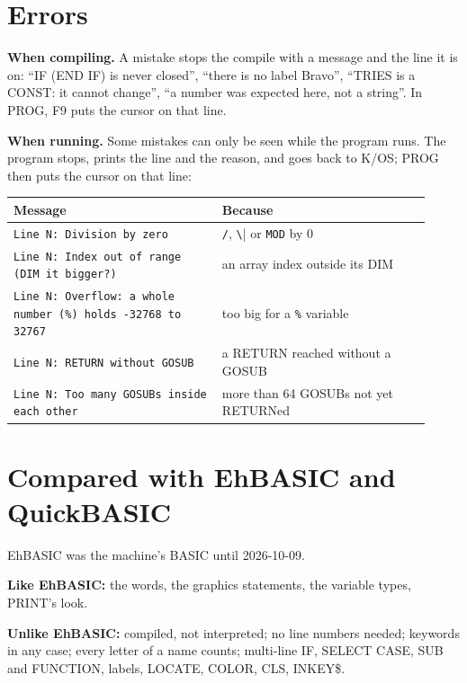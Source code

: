 \section{Errors}

\textbf{When compiling.} A mistake stops the compile with a message and the
line it is on: ``IF (END IF) is never closed'', ``there is no label
Bravo'', ``TRIES is a CONST: it cannot change'', ``a number was expected
here, not a string''. In PROG, F9 puts the cursor on that line.

\textbf{When running.} Some mistakes can only be seen while the program
runs. The program stops, prints the line and the reason, and goes back
to K/OS; PROG then puts the cursor on that line:

\begin{center}
\small
\begin{tabular}{@{}>{\raggedright\arraybackslash}p{0.46\linewidth} >{\raggedright\arraybackslash}p{0.46\linewidth}@{}}
\toprule
\textbf{Message} & \textbf{Because} \\
\midrule
\texttt{Line N: Division by zero} & \verb|/|, \verb|\| or \verb|MOD| by 0 \\
\texttt{Line N: Index out of range (DIM it bigger?)} & an array index outside its DIM \\
\texttt{Line N: Overflow: a whole number (\%) holds -{}32768 to 32767} & too big for a \verb|%| variable \\
\texttt{Line N: RETURN without GOSUB} & a RETURN reached without a GOSUB \\
\texttt{Line N: Too many GOSUBs inside each other} & more than 64 GOSUBs not yet RETURNed \\
\bottomrule
\end{tabular}
\end{center}

\section{Compared with EhBASIC and QuickBASIC}

EhBASIC was the machine's BASIC until 2026-10-09.

\textbf{Like EhBASIC:} the words, the graphics statements, the variable
types, PRINT's look.

\textbf{Unlike EhBASIC:} compiled, not interpreted; no line numbers needed;
keywords in any case; every letter of a name counts; multi-line IF,
SELECT CASE, SUB and FUNCTION, labels, LOCATE, COLOR, CLS, INKEY\$.

